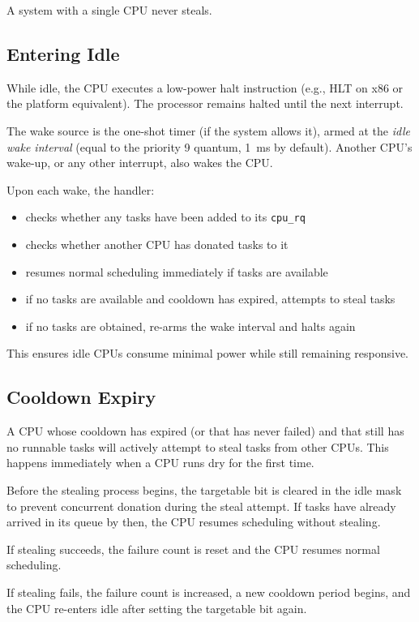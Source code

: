 \documentclass[11pt]{article}
\begin{document}
A system with a single CPU never steals.

\subsection{Entering Idle}

While idle, the CPU executes a low-power halt instruction (e.g., HLT on x86 or the platform equivalent).
The processor remains halted until the next interrupt.

The wake source is the one-shot timer (if the system allows it), armed at the \textit{idle wake interval} (equal to the priority 9 quantum, 1~ms by default).
Another CPU's wake-up, or any other interrupt, also wakes the CPU.

Upon each wake, the handler:

\begin{itemize}
	\item checks whether any tasks have been added to its \texttt{cpu\_rq}
	\item checks whether another CPU has donated tasks to it
	\item resumes normal scheduling immediately if tasks are available
	\item if no tasks are available and cooldown has expired, attempts to steal tasks
	\item if no tasks are obtained, re-arms the wake interval and halts again
\end{itemize}

This ensures idle CPUs consume minimal power while still remaining responsive.

\subsection{Cooldown Expiry}
\label{sec:cooldown-expiry}

A CPU whose cooldown has expired (or that has never failed) and that still has no runnable tasks will actively attempt to steal tasks from other CPUs.
This happens immediately when a CPU runs dry for the first time.

Before the stealing process begins, the targetable bit is cleared in the idle mask to prevent concurrent donation during the steal attempt.
If tasks have already arrived in its queue by then, the CPU resumes scheduling without stealing.

If stealing succeeds, the failure count is reset and the CPU resumes normal scheduling.

If stealing fails, the failure count is increased, a new cooldown period begins, and the CPU re-enters idle after setting the targetable bit again.
\end{document}
